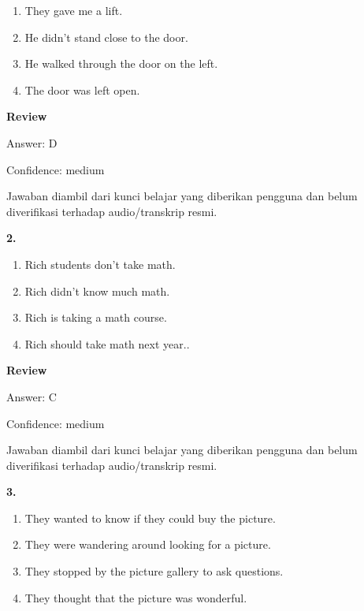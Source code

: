 \documentclass[12pt]{article}
\begin{document}
\begin{enumerate}[label=(\Alph*),leftmargin=*,itemsep=0.2em]
\item They gave me a lift.
\item He didn't stand close to the door.
\item He walked through the door on the left.
\item The door was left open.
\end{enumerate}
\par
\begingroup
\setlength{\parskip}{0pt}
\setlength{\parindent}{0pt}
\textbf{Review}\par
Answer: D\par
Confidence: medium\par
Jawaban diambil dari kunci belajar yang diberikan pengguna dan belum diverifikasi terhadap audio/transkrip resmi.\par
\endgroup
\par
\vspace{0.25\baselineskip}
\noindent\textbf{2.}
\begin{enumerate}[label=(\Alph*),leftmargin=*,itemsep=0.2em]
\item Rich students don't take math.
\item Rich didn't know much math.
\item Rich is taking a math course.
\item Rich should take math next year..
\end{enumerate}
\par
\begingroup
\setlength{\parskip}{0pt}
\setlength{\parindent}{0pt}
\textbf{Review}\par
Answer: C\par
Confidence: medium\par
Jawaban diambil dari kunci belajar yang diberikan pengguna dan belum diverifikasi terhadap audio/transkrip resmi.\par
\endgroup
\par
\vspace{0.25\baselineskip}
\noindent\textbf{3.}
\begin{enumerate}[label=(\Alph*),leftmargin=*,itemsep=0.2em]
\item They wanted to know if they could buy the picture.
\item They were wandering around looking for a picture.
\item They stopped by the picture gallery to ask questions.
\item They thought that the picture was wonderful.
\end{enumerate}
\end{document}
